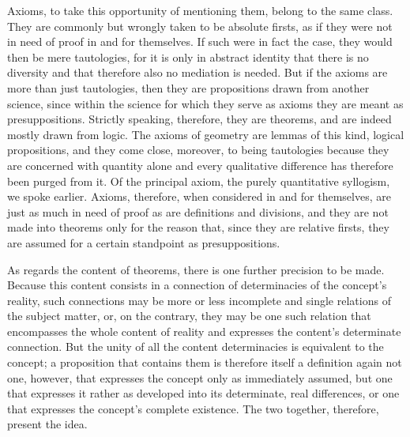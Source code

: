 Axioms, to take this opportunity of mentioning them, belong to the
same class. They are commonly but wrongly taken to be absolute firsts, as
if they were not in need of proof in and for themselves. If such were in
fact the case, they would then be mere tautologies, for it is only in abstract
identity that there is no diversity and that therefore also no mediation is
needed. But if the axioms are more than just tautologies, then they are
propositions drawn from another science, since within the science for which
they serve as axioms they are meant as presuppositions. Strictly speaking,
therefore, they are theorems, and are indeed mostly drawn from logic. The
axioms of geometry are lemmas of this kind, logical propositions, and they
come close, moreover, to being tautologies because they are concerned with
quantity alone and every qualitative difference has therefore been purged
from it. Of the principal axiom, the purely quantitative syllogism, we spoke
earlier.
Axioms, therefore, when considered in and for themselves, are
just as much in need of proof as are definitions and divisions, and they
are not made into theorems only for the reason that, since they are relative
firsts, they are assumed for a certain standpoint as presuppositions.

As regards the content of theorems, there is one further precision to be
made. Because this content consists in a connection of determinacies of
the concept's reality, such connections may be more or less incomplete
and single relations of the subject matter, or, on the contrary, they may
be one such relation that encompasses the whole content of reality and
expresses the content's determinate connection. But the unity of all the
content determinacies is equivalent to the concept; a proposition that contains
them is therefore itself a definition again
not one, however, that expresses
the concept only as immediately assumed, but one that expresses it rather
as developed into its determinate, real differences, or one that expresses
the concept's complete existence. The two together, therefore, present the
idea.

